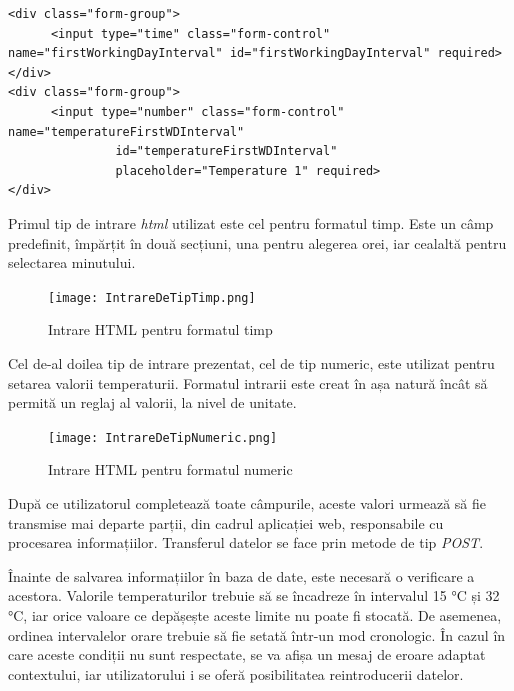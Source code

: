 \vspace{1em}
\begin{lstlisting}
<div class="form-group">
      <input type="time" class="form-control" name="firstWorkingDayInterval" id="firstWorkingDayInterval" required>
</div>
<div class="form-group">
      <input type="number" class="form-control" name="temperatureFirstWDInterval"
               id="temperatureFirstWDInterval"
               placeholder="Temperature 1" required>
</div>
\end{lstlisting}
\vspace{1em} 

	Primul tip de intrare \textit{html} utilizat este cel pentru formatul timp. Este un câmp predefinit, împărțit în două secțiuni, una pentru alegerea orei, iar cealaltă pentru selectarea minutului.
	
\begin{figure}[H]
   	\centering
    	\texttt{[image: IntrareDeTipTimp.png]}
	\caption{Intrare HTML pentru formatul timp}
\end{figure}

	Cel de-al doilea tip de intrare prezentat, cel de tip numeric, este utilizat pentru setarea valorii temperaturii. Formatul intrarii este creat în așa natură încât să permită un reglaj al valorii, la nivel de unitate.

\begin{figure}[H]
   	\centering
    	\texttt{[image: IntrareDeTipNumeric.png]}
	\caption{Intrare HTML pentru formatul numeric}
\end{figure}

	După ce utilizatorul completează toate câmpurile, aceste valori urmează să fie transmise mai departe parții, din cadrul aplicației web, responsabile cu procesarea informațiilor. Transferul datelor se face prin metode de tip \textit{POST}.

	Înainte de salvarea informațiilor în baza de date, este necesară o verificare a acestora. Valorile temperaturilor trebuie să se încadreze în intervalul 15 °C și 32 °C, iar orice valoare ce depășește aceste limite nu poate fi stocată. De asemenea, ordinea intervalelor orare trebuie să fie setată într-un mod cronologic. În cazul în care aceste condiții nu sunt respectate, se va afișa un mesaj de eroare adaptat contextului, iar utilizatorului i se oferă posibilitatea reintroducerii datelor.


